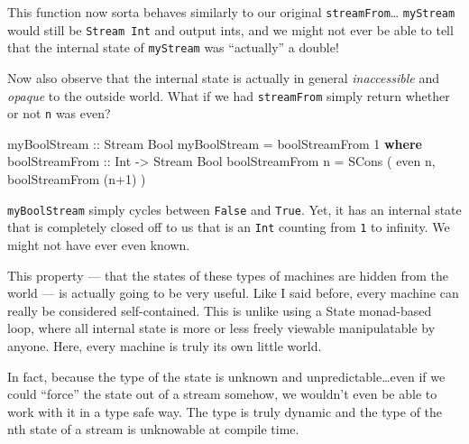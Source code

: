 \documentclass[]{article}
\newenvironment{Shaded}{}{}
\newcommand{\KeywordTok}[1]{\textcolor[rgb]{0.00,0.44,0.13}{\textbf{{#1}}}}
\newcommand{\DataTypeTok}[1]{\textcolor[rgb]{0.56,0.13,0.00}{{#1}}}
\newcommand{\DecValTok}[1]{\textcolor[rgb]{0.25,0.63,0.44}{{#1}}}
\newcommand{\OtherTok}[1]{\textcolor[rgb]{0.00,0.44,0.13}{{#1}}}
\newcommand{\FunctionTok}[1]{\textcolor[rgb]{0.02,0.16,0.49}{{#1}}}
\newcommand{\NormalTok}[1]{{#1}}
\begin{document}
This function now sorta behaves similarly to our original \texttt{streamFrom}\ldots{}
\texttt{myStream\textquotesingle{}} would still be \texttt{Stream\ Int} and output ints, and we
might not ever be able to tell that the internal state of \texttt{myStream\textquotesingle{}} was
``actually'' a double!

Now also observe that the internal state is actually in general \emph{inaccessible} and
\emph{opaque} to the outside world. What if we had \texttt{streamFrom} simply return whether or not
\texttt{n} was even?

\begin{Shaded}
\begin{Highlighting}[]
\OtherTok{myBoolStream ::} \DataTypeTok{Stream} \DataTypeTok{Bool}
\NormalTok{myBoolStream }\FunctionTok{=} \NormalTok{boolStreamFrom }\DecValTok{1}
  \KeywordTok{where}
\OtherTok{    boolStreamFrom ::} \DataTypeTok{Int} \OtherTok{->} \DataTypeTok{Stream} \DataTypeTok{Bool}
    \NormalTok{boolStreamFrom n }\FunctionTok{=} \DataTypeTok{SCons} \NormalTok{( even n, boolStreamFrom (n}\FunctionTok{+}\DecValTok{1}\NormalTok{) )}
\end{Highlighting}
\end{Shaded}

\begin{Shaded}
\end{Shaded}

\texttt{myBoolStream} simply cycles between \texttt{False} and \texttt{True}. Yet, it has an
internal state that is completely closed off to us that is an \texttt{Int} counting from \texttt{1}
to infinity. We might not have ever even known.

This property --- that the states of these types of machines are hidden from the world --- is
actually going to be very useful. Like I said before, every machine can really be considered
self-contained. This is unlike using a State monad-based loop, where all internal state is more or
less freely viewable manipulatable by anyone. Here, every machine is truly its own little world.

In fact, because the type of the state is unknown and unpredictable\ldots{}even if we could
``force'' the state out of a stream somehow, we wouldn't even be able to work with it in a type safe
way. The type is truly dynamic and the type of the nth state of a stream is unknowable at compile
time.
\end{document}
